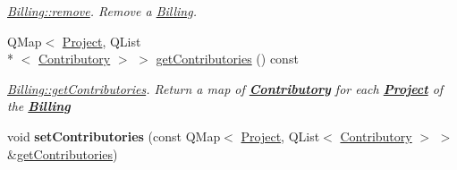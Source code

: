\begin{DoxyCompactItemize}
\begin{DoxyCompactList}\small\item\em \hyperlink{classBilling_ab5efe0286d292707073b9f1cecd98d6f}{Billing\-::remove}. Remove a \hyperlink{classBilling}{Billing}. \end{DoxyCompactList}\item 
Q\-Map$<$ \hyperlink{classProject}{Project}, Q\-List\\*
$<$ \hyperlink{classContributory}{Contributory} $>$ $>$ \hyperlink{classBilling_a08416c71eee43ec294e666ce45d43856}{get\-Contributories} () const 
\begin{DoxyCompactList}\small\item\em \hyperlink{classBilling_a08416c71eee43ec294e666ce45d43856}{Billing\-::get\-Contributories}. Return a map of {\bfseries \hyperlink{classContributory}{Contributory}} for each {\bfseries \hyperlink{classProject}{Project}} of the {\bfseries \hyperlink{classBilling}{Billing}} \end{DoxyCompactList}\item 
\hypertarget{classBilling_a25706aa084df2f345aaa1323130f78b4}{void {\bfseries set\-Contributories} (const Q\-Map$<$ \hyperlink{classProject}{Project}, Q\-List$<$ \hyperlink{classContributory}{Contributory} $>$ $>$ \&\hyperlink{classBilling_a08416c71eee43ec294e666ce45d43856}{get\-Contributories})}\label{classBilling_a25706aa084df2f345aaa1323130f78b4}


\end{DoxyCompactItemize}
